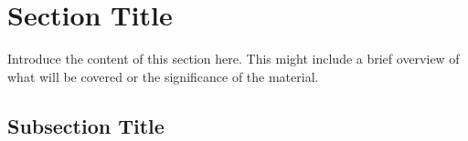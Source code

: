 \section{Section Title}
\label{sec:section_label} %

Introduce the content of this section here. This might include a brief overview of what will be covered or the significance of the material.

\subsection{Subsection Title}
\label{subsec:subsection_label} %


